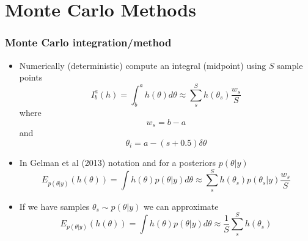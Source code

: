 \documentclass[10pt]{beamer}
\begin{document}
\section{Monte Carlo Methods}

\begin{frame}


\frametitle{Monte Carlo integration/method}

  \begin{itemize}
    \item Numerically (deterministic) compute an integral (midpoint) using $S$ sample points
    \[
      I^a_b(h) = \int^a_b h(\theta) d\theta \approx \sum_s^S h(\theta_s) \frac{w_s}{S}
    \]
    where
    \[
    w_s = b - a
    \]
    and
    \[
    \theta_i = a - (s + 0.5) \delta\theta
    \]
    \pause
    \item In Gelman et al (2013) notation and for a posteriors $p(\theta|y)$
    \[
      E_{p(\theta|y)}(h(\theta)) = \int h(\theta) p(\theta|y) d\theta \approx \sum_s^S h(\theta_s) p(\theta_s|y) \frac{w_s}{S}
    \]
    \pause
    \item If we have samples $\theta_s \sim p(\theta|y)$ we can approximate
        \[
      E_{p(\theta|y)}(h(\theta)) = \int h(\theta) p(\theta|y) d\theta \approx \frac{1}{S} \sum_s^S h(\theta_s)
    \]
  \end{itemize}

\end{frame}

\end{document}
